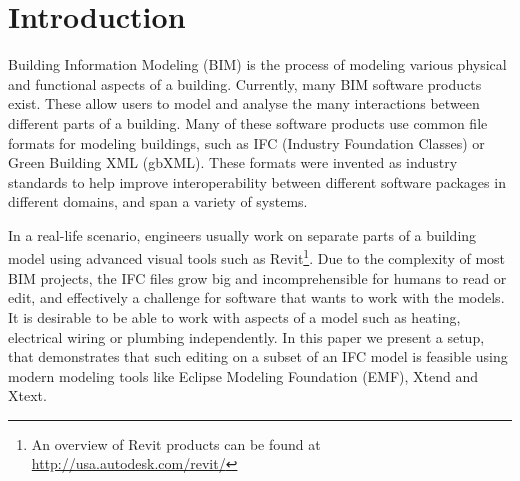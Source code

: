 

\setcounter{page}{1}
\section{Introduction}
Building Information Modeling (BIM) is the process of modeling various physical and functional aspects of a building. Currently, many BIM software products exist. These allow users to model and analyse the many interactions between different parts of a building. Many of these software products use common file formats for modeling buildings, such as IFC (Industry Foundation Classes) or Green Building XML (gbXML). These formats were invented as industry standards to help improve interoperability between different software packages in different domains, and span a variety of systems.

In a real-life scenario, engineers usually work on separate parts of a building model using advanced visual tools such as Revit\footnote{An overview of Revit products can be found at \url{http://usa.autodesk.com/revit/}}. Due to the complexity of most BIM projects, the IFC files grow big and incomprehensible for humans to read or edit, and effectively a challenge for software that wants to work with the models. It is desirable to be able to work with aspects of a model such as heating, electrical wiring or plumbing independently. In this paper we present a setup, that demonstrates that such editing on a subset of an IFC model is feasible using modern modeling tools like Eclipse Modeling Foundation (EMF), Xtend and Xtext.


